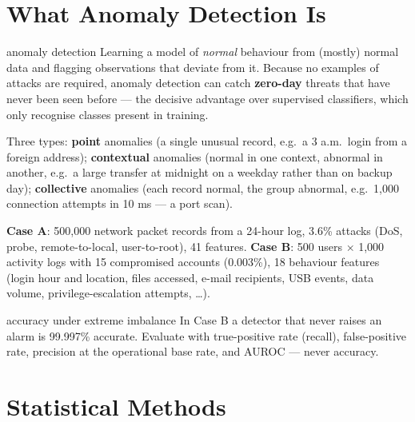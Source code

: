 \documentclass[11pt]{article}
\begin{document}
\tableofcontents
\newpage

\section{What Anomaly Detection Is}
\begin{definition}{anomaly detection}
Learning a model of \emph{normal} behaviour from (mostly) normal data and flagging observations that deviate from it. Because no examples of attacks are required, anomaly detection can catch \textbf{zero-day} threats that have never been seen before --- the decisive advantage over supervised classifiers, which only recognise classes present in training.
\end{definition}
Three types: \textbf{point} anomalies (a single unusual record, e.g.\ a 3 a.m.\ login from a foreign address); \textbf{contextual} anomalies (normal in one context, abnormal in another, e.g.\ a large transfer at midnight on a weekday rather than on backup day); \textbf{collective} anomalies (each record normal, the group abnormal, e.g.\ 1,000 connection attempts in 10 ms --- a port scan).

\textbf{Case A}: 500,000 network packet records from a 24-hour log, 3.6\% attacks (DoS, probe, remote-to-local, user-to-root), 41 features. \textbf{Case B}: 500 users $\times$ 1,000 activity logs with 15 compromised accounts (0.003\%), 18 behaviour features (login hour and location, files accessed, e-mail recipients, USB events, data volume, privilege-escalation attempts, \ldots).
\begin{pitfall}{accuracy under extreme imbalance}
In Case B a detector that never raises an alarm is 99.997\% accurate. Evaluate with true-positive rate (recall), false-positive rate, precision at the operational base rate, and AUROC --- never accuracy.
\end{pitfall}

\section{Statistical Methods}
\end{document}
